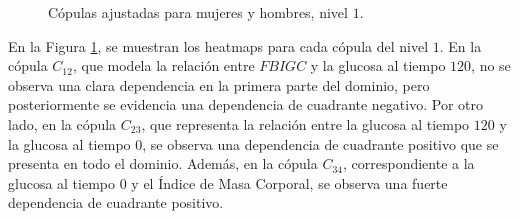 \begin{figure}[H]
 \centering
    \caption{Cópulas ajustadas para mujeres y hombres, nivel $1$.}
    \label{fig:Modelo4TotalNivel1}
\end{figure}

En la Figura \ref{fig:Modelo4TotalNivel1}, se muestran los heatmaps para cada cópula del nivel $1$. En la cópula $C_{12}$, que modela la relación entre $FBIGC$ y la glucosa al tiempo $120$, no se observa una clara dependencia en la primera parte del dominio, pero posteriormente se evidencia una dependencia de cuadrante negativo. Por otro lado, en la cópula $C_{23}$, que representa la relación entre la glucosa al tiempo $120$ y la glucosa al tiempo $0$, se observa una dependencia de cuadrante positivo que se presenta en todo el dominio. Además, en la cópula $C_{34}$, correspondiente a la glucosa al tiempo $0$ y el Índice de Masa Corporal, se observa una fuerte dependencia de cuadrante positivo.

